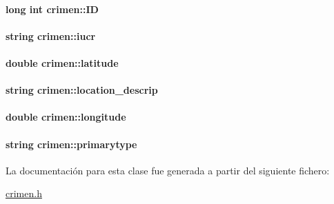 \hypertarget{classcrimen_a59702f88f0b0c25781ae3d296790dcb8}{
\paragraph[{I\+D}]{\setlength{\rightskip}{0pt plus 5cm}long int crimen\+::\+I\+D\hspace{0.3cm}{\ttfamily [private]}}}\label{classcrimen_a59702f88f0b0c25781ae3d296790dcb8}
\hypertarget{classcrimen_a5699c8bd36d3cad23cff70cbd984f616}{
\paragraph[{iucr}]{\setlength{\rightskip}{0pt plus 5cm}string crimen\+::iucr\hspace{0.3cm}{\ttfamily [private]}}}\label{classcrimen_a5699c8bd36d3cad23cff70cbd984f616}
\hypertarget{classcrimen_a1ecd1bcebba3566f13a469ec82f647a0}{
\paragraph[{latitude}]{\setlength{\rightskip}{0pt plus 5cm}double crimen\+::latitude\hspace{0.3cm}{\ttfamily [private]}}}\label{classcrimen_a1ecd1bcebba3566f13a469ec82f647a0}
\hypertarget{classcrimen_a707cfdaffc34589df0689e8f86b67765}{
\paragraph[{location\+\_\+descrip}]{\setlength{\rightskip}{0pt plus 5cm}string crimen\+::location\+\_\+descrip\hspace{0.3cm}{\ttfamily [private]}}}\label{classcrimen_a707cfdaffc34589df0689e8f86b67765}
\hypertarget{classcrimen_ac140577426c2a38d58ec1907bce53492}{
\paragraph[{longitude}]{\setlength{\rightskip}{0pt plus 5cm}double crimen\+::longitude\hspace{0.3cm}{\ttfamily [private]}}}\label{classcrimen_ac140577426c2a38d58ec1907bce53492}
\hypertarget{classcrimen_a6d23454b3b810d0d9ff3245ab6bfbfbe}{
\paragraph[{primarytype}]{\setlength{\rightskip}{0pt plus 5cm}string crimen\+::primarytype\hspace{0.3cm}{\ttfamily [private]}}}\label{classcrimen_a6d23454b3b810d0d9ff3245ab6bfbfbe}


La documentación para esta clase fue generada a partir del siguiente fichero\+:\begin{DoxyCompactItemize}
\item 
\hyperlink{crimen_8h}{crimen.\+h}\end{DoxyCompactItemize}
